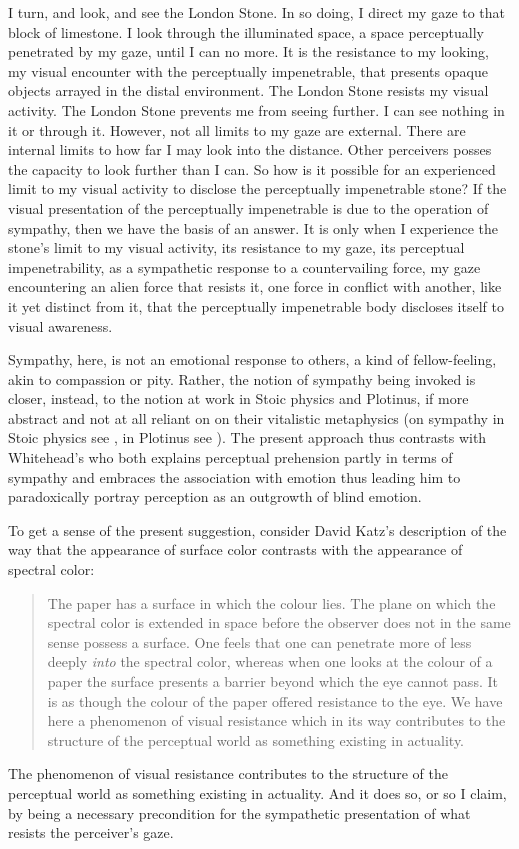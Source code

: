\documentclass[12pt]{article}
\begin{document}
I turn, and look, and see the London Stone. In so doing, I direct my gaze to that block of limestone. I look through the illuminated space, a space perceptually penetrated by my gaze, until I can no more. It is the resistance to my looking, my visual encounter with the perceptually impenetrable, that presents opaque objects arrayed in the distal environment. The London Stone resists my visual activity. The London Stone prevents me from seeing further. I can see nothing in it or through it. However, not all limits to my gaze are external. There are internal limits to how far I may look into the distance. Other perceivers posses the capacity to look further than I can. So how is it possible for an experienced limit to my visual activity to disclose the perceptually impenetrable stone? If the visual presentation of the perceptually impenetrable is due to the operation of sympathy, then we have the basis of an answer. It is only when I experience the stone’s limit to my visual activity, its resistance to my gaze, its perceptual impenetrability, as a sympathetic response to a countervailing force, my gaze encountering an alien force that resists it, one force in conflict with another, like it yet distinct from it, that the perceptually impenetrable body discloses itself to visual awareness.

Sympathy, here, is not an emotional response to others, a kind of fellow-feeling, akin to compassion or pity. Rather, the notion of sympathy being invoked is closer, instead, to the notion at work in Stoic physics and Plotinus, if more abstract and not at all reliant on on their vitalistic metaphysics (on sympathy in Stoic physics see \citealt{Brouwer:2015ee}, in Plotinus see \citealt{Emilsson:2015wf}). The present approach thus contrasts with Whitehead’s \citeyearpar{Whitehead:1978zr} who both explains perceptual prehension partly in terms of sympathy and embraces the association with emotion thus leading him to paradoxically portray perception as an outgrowth of blind emotion.

To get a sense of the present suggestion, consider David Katz's description of the way that the appearance of surface color contrasts with the appearance of spectral color:
\begin{quote}
	The paper has a surface in which the colour lies. The plane on which the spectral color is extended in space before the observer does not in the same sense possess a surface. One feels that one can penetrate more of less deeply \emph{into} the spectral color, whereas when one looks at the colour of a paper the surface presents a barrier beyond which the eye cannot pass. It is as though the colour of the paper offered resistance to the eye. We have here a phenomenon of visual resistance which in its way contributes to the structure of the perceptual world as something existing in actuality. \citep[8]{Katz:1935qv}
\end{quote}
The phenomenon of visual resistance contributes to the structure of the perceptual world as something existing in actuality. And it does so, or so I claim, by being a necessary precondition for the sympathetic presentation of what resists the perceiver's gaze. 
\end{document}

